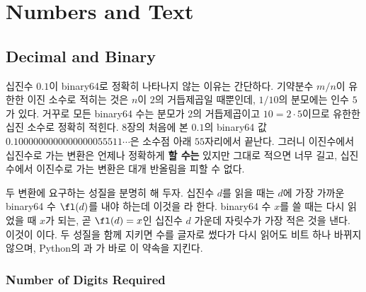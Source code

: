 \chapter{Numbers and Text}
\label{ch:number-text}


\section{Decimal and Binary}
\label{sec:decimal-binary}

십진수 $0.1$이 binary64로 정확히 나타나지 않는 이유는 간단하다. 기약분수 $m/n$이 유한한 이진 소수로 적히는 것은 $n$이 $2$의 거듭제곱일 때뿐인데, $1/10$의 분모에는 인수 $5$가 있다. 거꾸로 모든 binary64 수는 분모가 $2$의 거듭제곱이고 $10=2\cdot5$이므로 유한한 십진 소수로 정확히 적힌다. 8장의 처음에 본 $0.1$의 binary64 값 $0.1000000000000000055511\cdots$은 소수점 아래 $55$자리에서 끝난다. 그러니 이진수에서 십진수로 가는 변환은 언제나 정확하게 \textbf{할 수는} 있지만 그대로 적으면 너무 길고, 십진수에서 이진수로 가는 변환은 대개 반올림을 피할 수 없다.

두 변환에 요구하는 성질을 분명히 해 두자. 십진수 $d$를 읽을 때는 $d$에 가장 가까운 binary64 수 $\fl(d)$를 내야 하는데 이것을 라 한다. binary64 수 $x$를 쓸 때는 다시 읽었을 때 $x$가 되는, 곧 $\fl(d)=x$인 십진수 $d$ 가운데 자릿수가 가장 적은 것을 낸다. 이것이 이다. 두 성질을 함께 지키면 수를 글자로 썼다가 다시 읽어도 비트 하나 바뀌지 않으며, Python의 과 가 바로 이 약속을 지킨다.

\subsection{Number of Digits Required}

